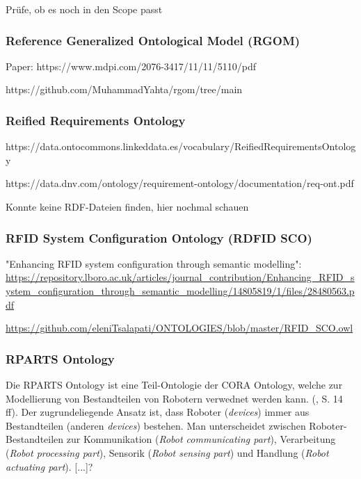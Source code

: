 \documentclass{article}
\begin{document}
Prüfe, ob es noch in den Scope passt

\subsubsection{Reference Generalized Ontological Model (RGOM)}

Paper: https://www.mdpi.com/2076-3417/11/11/5110/pdf

https://github.com/MuhammadYahta/rgom/tree/main

\subsubsection{Reified Requirements Ontology}

https://data.ontocommons.linkeddata.es/vocabulary/ReifiedRequirementsOntology

https://data.dnv.com/ontology/requirement-ontology/documentation/req-ont.pdf

Konnte keine RDF-Dateien finden, hier nochmal schauen

\subsubsection{RFID System Configuration Ontology (RDFID SCO)}

"Enhancing RFID system configuration through semantic modelling": \url{https://repository.lboro.ac.uk/articles/journal_contribution/Enhancing_RFID_system_configuration_through_semantic_modelling/14805819/1/files/28480563.pdf}

\url{https://github.com/eleniTsalapati/ONTOLOGIES/blob/master/RFID_SCO.owl}

\subsubsection{RPARTS Ontology}


Die RPARTS Ontology ist eine Teil-Ontologie der CORA Ontology, welche zur Modellierung von Bestandteilen von Robotern verwednet werden kann. (\cite{fiorini2015extensions}, S. 14 ff).
Der zugrundeliegende Ansatz ist, dass Roboter (\textit{devices}) immer aus Bestandteilen (anderen \textit{devices}) bestehen.
Man unterscheidet zwischen Roboter-Bestandteilen zur Kommunikation (\textit{Robot communicating part}), Verarbeitung (\textit{Robot processing part}), Sensorik (\textit{Robot sensing part}) und Handlung (\textit{Robot actuating part}).
[...]?
\end{document}
